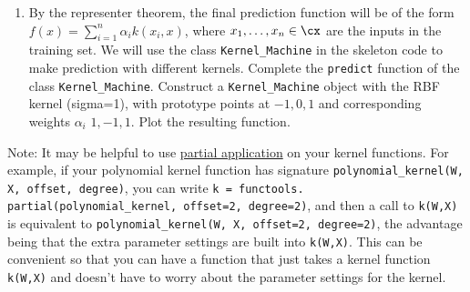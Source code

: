 \documentclass{article}
\newcommand{\nyuparagraph}[1]{\textcolor{nyupurple}{\large #1}}
\theoremstyle{plain}
\theoremstyle{definition}
\begin{document}
\begin{enumerate}
\item By the representer theorem, the final prediction function will be
of the form $f(x)=\sum_{i=1}^{n}\alpha_{i}k(x_{i},x)$, where $x_{1},\ldots,x_{n}\in\cx$
are the inputs in the training set. 
We will use the class \texttt{Kernel\_Machine} in the skeleton code to make prediction with different kernels.
Complete the \texttt{predict} function
of the class \texttt{Kernel\_Machine}. Construct
a \texttt{Kernel\_Machine} object with the RBF kernel (sigma=1), with
prototype points at $-1,0,1$ and corresponding weights $\alpha_i$ $1,-1,1$.
Plot the resulting function.\\
\setcounter{saveenum}{\value{enumi}}
\end{enumerate}

Note: It may be helpful to use
\href{https://en.wikipedia.org/wiki/Partial_application}{partial application}
on your kernel functions. For example, if your polynomial kernel function has
signature \texttt{polynomial\_kernel(W, X, offset, degree)}, you can write
\texttt{k = functools. partial(polynomial\_kernel, offset=2, degree=2)}, and
then a call to \texttt{k(W,X)} is equivalent to \texttt{polynomial\_kernel(W,
X, offset=2, degree=2)}, the advantage being that the extra parameter settings
are built into \texttt{k(W,X)}. This can be convenient so that you can have a
function that just takes a kernel function \texttt{k(W,X)} and doesn't have to
worry about the parameter settings for the kernel.


\end{document}
